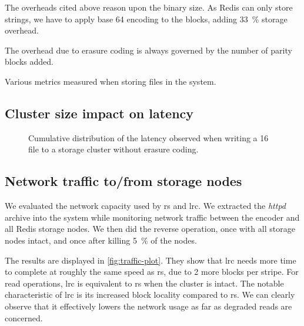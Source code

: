 The overheads cited above reason upon the binary size.
As Redis can only store strings, we have to apply base 64 encoding to the blocks, adding \SI{33}{\percent} storage overhead.

The overhead due to erasure coding is always governed by the number of parity blocks added.

\begin{table*}
    \centering
    \caption{Various metrics measured when storing files in the system.}
    
    \label{fig:overhead-table}
\end{table*}

\subsection{Cluster size impact on latency}
\label{subsec:latency}

\begin{figure}
    \centering
    
    \caption{Cumulative distribution of the latency observed when writing a \SI{16}{\mebi\byte} file to a storage cluster without erasure coding.}
    \label{fig:latency-plot}
\end{figure}

\subsection{Network traffic to/from storage nodes}
\label{subsec:network-traffic}

We evaluated the network capacity used by \ac{rs} and \ac{lrc}.
We extracted the \textit{httpd} archive into the system while monitoring network traffic between the encoder and all Redis storage nodes.
We then did the reverse operation, once with all storage nodes intact, and once after killing \SI{5}{\percent} of the nodes.

The results are displayed in \autoref{fig:traffic-plot}.
They show that \ac{lrc} needs more time to complete at roughly the same speed as \ac{rs}, due to 2 more blocks per stripe.
For read operations, \ac{lrc} is equivalent to \ac{rs} when the cluster is intact.
The notable characteristic of \ac{lrc} is its increased block locality compared to \ac{rs}.
We can clearly observe that it effectively lowers the network usage as far as degraded reads are concerned.

